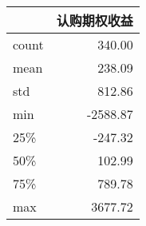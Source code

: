 \begin{tabular}{lr}
\toprule
{} &   认购期权收益 \\
\midrule
count &   340.00 \\
mean  &   238.09 \\
std   &   812.86 \\
min   & -2588.87 \\
25\%   &  -247.32 \\
50\%   &   102.99 \\
75\%   &   789.78 \\
max   &  3677.72 \\
\bottomrule
\end{tabular}
